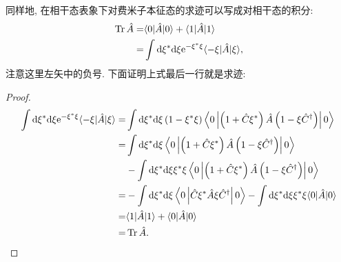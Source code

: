 同样地, 在相干态表象下对费米子本征态的求迹可以写成对相干态的积分:
\begin{align}
\operatorname{Tr} \hat{A}=&\langle 0|\hat{A}| 0\rangle+\langle 1|\hat{A}| 1\rangle \nonumber\\
=& \int \mathrm{d} \xi^{*} \mathrm{d} \xi \mathrm{e}^{-\xi^{*} \xi}\langle-\xi|\hat{A}| \xi\rangle,
\end{align}
注意这里左矢中的负号. 下面证明上式最后一行就是求迹:
\begin{proof}
\begin{align}
\int \mathrm{d} \xi^{*} \mathrm{d} \xi \mathrm{e}^{-\xi^{*} \xi}\langle-\xi|\hat{A}| \xi\rangle=& \int \mathrm{d} \xi^{*} \mathrm{d} \xi\left(1-\xi^{*} \xi\right)\left\langle 0\left|\left(1+\hat{C} \xi^{*}\right) \hat{A}\left(1-\xi \hat{C}^{\dagger}\right)\right| 0\right\rangle \nonumber\\
=& \int \mathrm{d} \xi^{*} \mathrm{d} \xi\left\langle 0\left|\left(1+\hat{C} \xi^{*}\right) \hat{A}\left(1-\xi \hat{C}^{\dagger}\right)\right| 0\right\rangle \nonumber\\
&-\int \mathrm{d} \xi^{*} \mathrm{d} \xi \xi^{*} \xi\left\langle 0\left|\left(1+\hat{C} \xi^{*}\right) \hat{A}\left(1-\xi \hat{C}^{\dagger}\right)\right| 0\right\rangle \nonumber\\
=&-\int \mathrm{d} \xi^{*} \mathrm{d} \xi\left\langle 0\left|\hat{C} \xi^{*} \hat{A} \xi \hat{C}^{\dagger}\right| 0\right\rangle-\int \mathrm{d} \xi^{*} \mathrm{d} \xi \xi^{*} \xi\langle 0|\hat{A}| 0\rangle \nonumber\\
=&\langle 1|\hat{A}| 1\rangle+\langle 0|\hat{A}| 0\rangle \nonumber\\
=&\operatorname{Tr} \hat{A}.
\end{align}
\end{proof}

